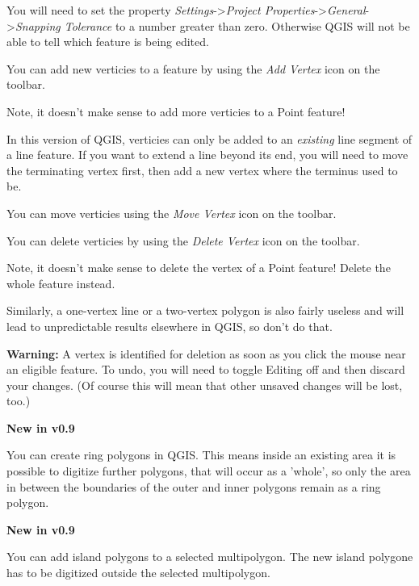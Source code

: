 You will need to set the property
\textit{Settings}->\textit{Project Properties}->\textit{General}->\textit{Snapping Tolerance}
to a number greater than zero.  Otherwise QGIS will not be able to tell which feature is being edited.



You can add new verticies to a feature by using the \textit{Add Vertex} icon
on the toolbar.

Note, it doesn't make sense to add more verticies to a Point feature!

In this version of QGIS, verticies can only be added to an \textit{existing} line
segment of a line feature.  If you want to extend a line beyond its end,
you will need to move the terminating vertex first, then add a new vertex where
the terminus used to be.


You can move verticies using the \textit{Move Vertex} icon
on the toolbar.


You can delete verticies by using the \textit{Delete Vertex} icon
on the toolbar.

Note, it doesn't make sense to delete the vertex of a Point feature!
Delete the whole feature instead.

Similarly, a one-vertex line or a two-vertex polygon is also
fairly useless and will lead to unpredictable results elsewhere
in QGIS, so don't do that.

\textbf{Warning:} A vertex is identified for deletion as
soon as you click the mouse near an eligible
feature.  To undo, you will need to toggle
Editing off and then discard your changes.
(Of course this will mean that other unsaved changes will be lost, too.)

\textbf{New in v0.9}

You can create ring polygons in QGIS. This means inside an existing area it is
possible to digitize further polygons, that will occur as a 'whole', so only 
the area in between the boundaries of the outer and inner polygons remain as 
a ring polygon. 

\textbf{New in v0.9}

You can add island polygons to a selected multipolygon. The new island polygone 
has to be digitized outside the selected multipolygon. 

